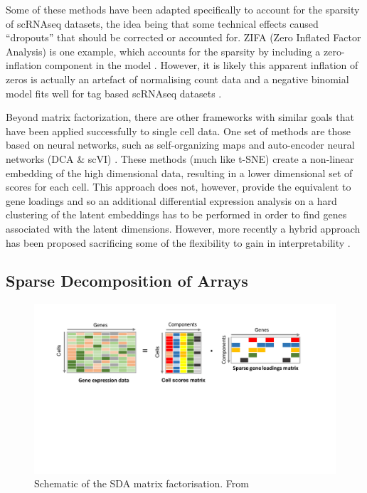 
Some of these methods have been adapted specifically to account for the sparsity of scRNAseq datasets, the idea being that some technical effects caused ``dropouts'' that should be corrected or accounted for.
ZIFA (Zero Inflated Factor Analysis) is one example, which accounts for the sparsity by including a zero-inflation component in the model \parencite{Pierson2015ZIFA}.
However, it is likely this apparent inflation of zeros is actually an artefact of normalising count data and a negative binomial model fits well for tag based scRNAseq datasets \parencite{Vieth2017powsimR, Svensson2019Droplet, Townes2019Feature}.

Beyond matrix factorization, there are other frameworks with similar goals that have been applied successfully to single cell data.
One set of methods are those based on neural networks, such as self-organizing maps \parencite{Loffler-Wirth2015oposSOM, Kim2015SingleCell} and auto-encoder neural networks (DCA \& scVI) \parencite{Eraslan2019Singlecell, Lopez2018Deep}.
These methods (much like t-SNE) create a non-linear embedding of the high dimensional data, resulting in a lower dimensional set of scores for each cell.
This approach does not, however, provide the equivalent to gene loadings and so an additional differential expression analysis on a hard clustering of the latent embeddings has to be performed in order to find genes associated with the latent dimensions.
However, more recently a hybrid approach has been proposed sacrificing some of the flexibility to gain in interpretability \parencite{Svensson2019Interpretable}.


\subsection{Sparse Decomposition of Arrays}


\begin{figure}[H]
	\centering
	\includegraphics[width=\textwidth]{figures/intro/matrix_decomp_cells.pdf}
	\caption[SDA Matrix Factorisation]{Schematic of the SDA matrix factorisation. From \parencite{Hore2015Latent}}
	\label{fig:SDAfactorisation}
\end{figure}

